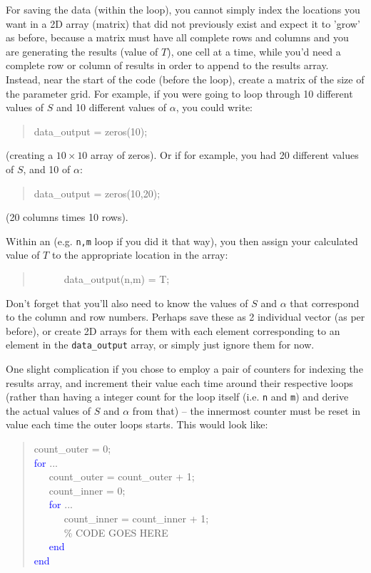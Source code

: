 \documentclass{tufte-book} %
\newenvironment{docspec}{\begin{quotation}\ttfamily\parskip0pt\parindent0pt\ignorespaces}{\end{quotation}}
\begin{document}
For saving the data (within the loop), you cannot  simply index the locations you want in a 2D array (matrix) that did not previously exist and expect it to 'grow' as before, because a matrix must have all complete rows and columns and you are generating the results (value of \(T\)), one cell at a time, while you'd need a complete row or column of results in order to append to the results array. Instead, near the start of the code (before the loop), create a matrix of the size of the parameter grid. For example, if you were going to loop through 10 different values of \(S\) and 10 different values of \(\alpha\), you could write:
\begin{docspec}
data\_output = zeros(10);
\end{docspec}
(creating a \(10\times10\) array of zeros). Or if for example, you had 20 different  values of \(S\), and 10 of \(\alpha\):
\begin{docspec}
data\_output = zeros(10,20);
\end{docspec}
(20 columns times 10 rows).

Within an (e.g. \texttt{n,m} loop if you did it that way), you then assign your calculated value of \(T\) to the appropriate location in the array:
\begin{docspec}
\ \ \ \ \ \ data\_output(n,m) = T;
\end{docspec}
Don't forget that you'll also need to know the values of \(S\) and \(\alpha\) that correspond to the column and row numbers. Perhaps save these as 2 individual vector (as per before), or create 2D arrays for them with each element corresponding to an element in the \texttt{data\_output} array, or simply just ignore them for now.

One slight complication if you chose to employ a pair of counters for indexing the results array, and increment their value each time around their respective loops (rather than having a integer count for the loop itself (i.e. \texttt{n} and \texttt{m}) and derive the actual values of  \(S\) and \(\alpha\) from that) -- the innermost counter must be reset in value each time the outer loops starts. This would look like:

\vspace{8mm}
\pagebreak

\begin{docspec}
count\_outer = 0;
\\\textcolor{blue}{for} ...
\\ \ \ \ count\_outer = count\_outer + 1;
\\ \ \ \ count\_inner = 0;
\\ \ \ \ \textcolor{blue}{for} ...
\\ \ \ \ \ \ \ count\_inner = count\_inner + 1;
\\ \ \ \ \ \ \ \textcolor[rgb]{0,0.501961,0}{\% CODE GOES HERE}
\\ \ \ \ \textcolor{blue}{end}
\\\textcolor{blue}{end}
\end{docspec}
\end{document}
